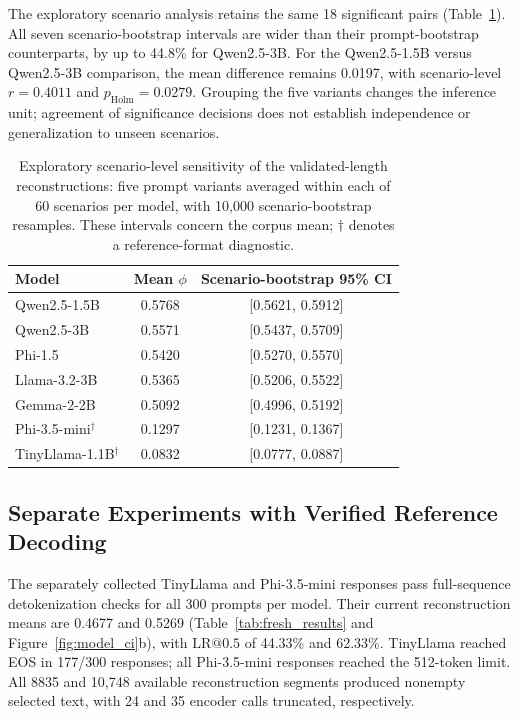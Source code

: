 \documentclass[electronics,article,submit,pdftex,moreauthors]{Definitions/mdpi}
\begin{document}
The exploratory scenario analysis retains the same 18 significant pairs (Table~\ref{tab:scenario_sensitivity}). All seven scenario-bootstrap intervals are wider than their prompt-bootstrap counterparts, by up to 44.8\% for Qwen2.5-3B. For the Qwen2.5-1.5B versus Qwen2.5-3B comparison, the mean difference remains 0.0197, with scenario-level $r=0.4011$ and $p_{\mathrm{Holm}}=0.0279$. Grouping the five variants changes the inference unit; agreement of significance decisions does not establish independence or generalization to unseen scenarios.

\begin{table}[ht]
\centering
\caption{Exploratory scenario-level sensitivity of the validated-length reconstructions: five prompt variants averaged within each of 60 scenarios per model, with 10,000 scenario-bootstrap resamples. These intervals concern the corpus mean; $\dagger$ denotes a reference-format diagnostic.}
\label{tab:scenario_sensitivity}
\begin{tabular}{l c c}
\toprule
Model & Mean $\phi$ & Scenario-bootstrap 95\% CI \\
\midrule
Qwen2.5-1.5B & 0.5768 & [0.5621, 0.5912] \\
Qwen2.5-3B & 0.5571 & [0.5437, 0.5709] \\
Phi-1.5 & 0.5420 & [0.5270, 0.5570] \\
Llama-3.2-3B & 0.5365 & [0.5206, 0.5522] \\
Gemma-2-2B & 0.5092 & [0.4996, 0.5192] \\
Phi-3.5-mini$^{\dagger}$ & 0.1297 & [0.1231, 0.1367] \\
TinyLlama-1.1B$^{\dagger}$ & 0.0832 & [0.0777, 0.0887] \\
\bottomrule
\end{tabular}
\end{table}

\subsection{Separate Experiments with Verified Reference Decoding}\label{sec:fresh}
The separately collected TinyLlama and Phi-3.5-mini responses pass full-sequence detokenization checks for all 300 prompts per model. Their current reconstruction means are 0.4677 and 0.5269 (Table~\ref{tab:fresh_results} and Figure~\ref{fig:model_ci}b), with $\mathrm{LR}@0.5$ of 44.33\% and 62.33\%. TinyLlama reached EOS in 177/300 responses; all Phi-3.5-mini responses reached the 512-token limit. All 8835 and 10,748 available reconstruction segments produced nonempty selected text, with 24 and 35 encoder calls truncated, respectively.
\end{document}

